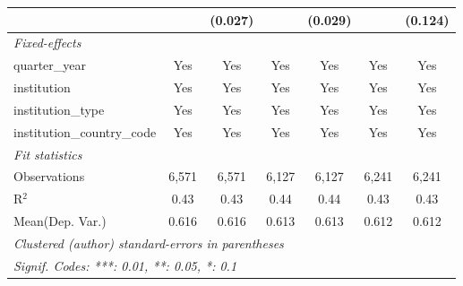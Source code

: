 \begin{tabular}{lcccccc}
                                      &               & (0.027)       &               & (0.029)        &               & (0.124)\\   
   \midrule
   \emph{Fixed-effects}\\
   quarter\_year                      & Yes           & Yes           & Yes           & Yes            & Yes           & Yes\\  
   institution                        & Yes           & Yes           & Yes           & Yes            & Yes           & Yes\\  
   institution\_type                  & Yes           & Yes           & Yes           & Yes            & Yes           & Yes\\  
   institution\_country\_code         & Yes           & Yes           & Yes           & Yes            & Yes           & Yes\\  
   \midrule
   \emph{Fit statistics}\\
   Observations                       & 6,571         & 6,571         & 6,127         & 6,127          & 6,241         & 6,241\\  
   R$^2$                              & 0.43          & 0.43          & 0.44          & 0.44           & 0.43          & 0.43\\  
Mean(Dep. Var.) & 0.616 & 0.616 & 0.613 & 0.613 & 0.612 & 0.612 \\
   \midrule \midrule
   \multicolumn{7}{l}{\emph{Clustered (author) standard-errors in parentheses}}\\
   \multicolumn{7}{l}{\emph{Signif. Codes: ***: 0.01, **: 0.05, *: 0.1}}\\
\end{tabular}
\par\endgroup
